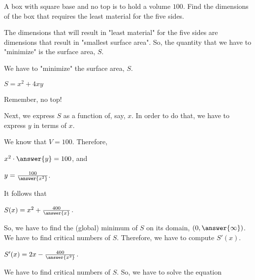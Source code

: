 \documentclass{ximera}
\author{Bart Snapp\and Nela Lakos}
\begin{document}
\begin{exercise}

  
  A box with square base and no top is to hold a volume $100$.  Find
  the dimensions of the box that requires the least material for the
  five sides.
  \begin{hint}
  \end{hint}
  \begin{hint}
  The dimensions that will result in  "least material" for the five sides are dimensions that result in "smallest surface area".
  So, the quantity that we have to "minimize" is the surface area, $S$.
  \end{hint}
  \begin{hint}
  We have to "minimize"  the surface area, $S$.
  
  $S=x^2 +4xy$
  
  Remember, no top!
  \end{hint}
    \begin{hint}
Next, we express $S$ as a function of, say, $x$.
In order to do that, we have to express $y$ in terms of $x$.


We know that  $V=100$. Therefore,

$x^2\cdot \answer{ y}=100$,
and 

$y=\frac{100}{\answer{x^2}}$.
  
 It follows that 
  
   $S(x)=x^2 +\frac{400}{\answer{x}}$.

  \end{hint}
  \begin{hint}
  So, we have to find the (global) minimum of $S$ on its domain, $(0,\answer{\infty})$.
  We have to find critical numbers of $S$.
  Therefore, we have to compute $S'(x)$.
  \end{hint}
  \begin{hint}
  $S'(x)=2x-\frac{400}{\answer{x^2}}$.
    \end{hint}
     \begin{hint}
     We have to find critical numbers of $S$.
     So, we have to solve the equation
     

\end{hint}
\end{exercise}
\end{document}
